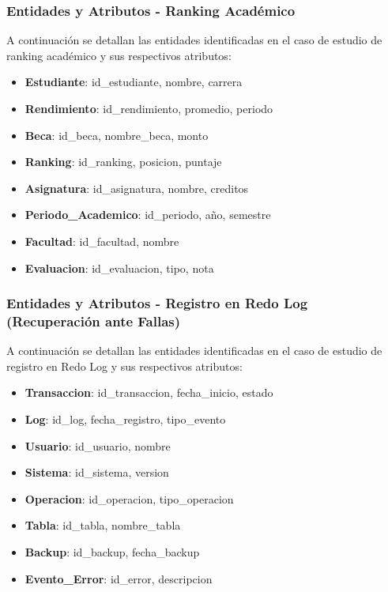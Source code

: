 \documentclass{article}
\begin{document}
\subsubsection{Entidades y Atributos - Ranking Académico}

A continuación se detallan las entidades identificadas en el caso de estudio de ranking académico y sus respectivos atributos:

\begin{itemize}
    \item \textbf{Estudiante}: id\_estudiante, nombre, carrera
    \item \textbf{Rendimiento}: id\_rendimiento, promedio, periodo
    \item \textbf{Beca}: id\_beca, nombre\_beca, monto
    \item \textbf{Ranking}: id\_ranking, posicion, puntaje
    \item \textbf{Asignatura}: id\_asignatura, nombre, creditos
    \item \textbf{Periodo\_Academico}: id\_periodo, año, semestre
    \item \textbf{Facultad}: id\_facultad, nombre
    \item \textbf{Evaluacion}: id\_evaluacion, tipo, nota
\end{itemize}

\subsubsection{Entidades y Atributos - Registro en Redo Log (Recuperación ante Fallas)}

A continuación se detallan las entidades identificadas en el caso de estudio de registro en Redo Log y sus respectivos atributos:

\begin{itemize}
    \item \textbf{Transaccion}: id\_transaccion, fecha\_inicio, estado
    \item \textbf{Log}: id\_log, fecha\_registro, tipo\_evento
    \item \textbf{Usuario}: id\_usuario, nombre
    \item \textbf{Sistema}: id\_sistema, version
    \item \textbf{Operacion}: id\_operacion, tipo\_operacion
    \item \textbf{Tabla}: id\_tabla, nombre\_tabla
    \item \textbf{Backup}: id\_backup, fecha\_backup
    \item \textbf{Evento\_Error}: id\_error, descripcion
\end{itemize}
\end{document}
